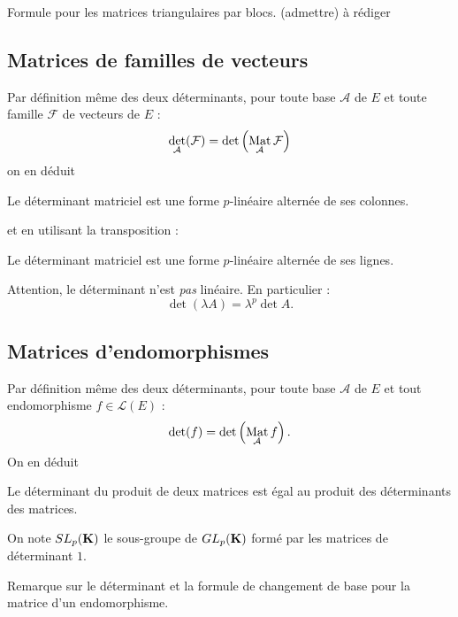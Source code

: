 Formule pour les matrices triangulaires par blocs. (admettre) à rédiger

\subsection{Matrices de familles de vecteurs}
Par définition même des deux déterminants, pour toute base $\mathcal A$ de $E$ et toute famille $\mathcal F$ de vecteurs de $E$ :
\begin{displaymath}
 \det_{\mathcal A}(\mathcal F) = \det \left( \mathop{\mathrm{Mat}}_{\mathcal A}\mathcal F\right) 
\end{displaymath}
on en déduit
\begin{propn}
Le déterminant matriciel est une forme $p$-linéaire alternée de ses colonnes.
\end{propn}
et en utilisant la transposition :
\begin{propn}
Le déterminant matriciel est une forme $p$-linéaire alternée de ses lignes. 
\end{propn}
Attention, le déterminant n'est \emph{pas} linéaire. En particulier :
\begin{displaymath}
 \det \left( \lambda A\right)  = \lambda^p \det A.
\end{displaymath}

\subsection{Matrices d'endomorphismes}
Par définition même des deux déterminants, pour toute base $\mathcal A$ de $E$ et tout endomorphisme $f \in \mathcal L(E)$ :
\begin{displaymath}
 \det(f) = \det \left( \mathop{\mathrm{Mat}}_{\mathcal A}f\right). 
\end{displaymath}
On en déduit
\begin{propn}
 Le déterminant du produit de deux matrices est égal au produit des déterminants des matrices. 
\end{propn}
\begin{defi}
 On note $SL_p(\mathbf{K})$ le sous-groupe de $GL_p(\mathbf{K})$ formé par les matrices de déterminant $1$.
\end{defi}
Remarque sur le déterminant et la formule de changement de base pour la matrice d'un endomorphisme.

